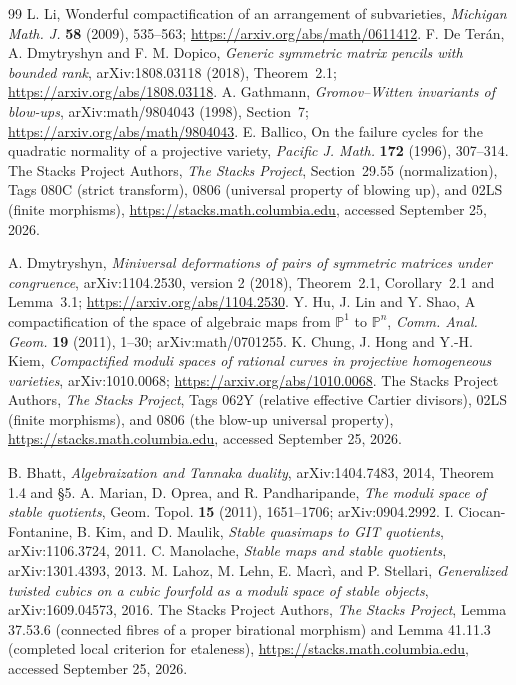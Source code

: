 \documentclass[11pt,reqno]{amsart}
\numberwithin{equation}{section}
\theoremstyle{definition}\newtheorem{definition}[theorem]{Definition}
\theoremstyle{remark}\newtheorem{remark}[theorem]{Remark}
\newcommand{\Pj}{\mathbb P}\newcommand{\A}{\mathbb A}
\begin{document}
\begin{thebibliography}{99}
L. Li, Wonderful compactification of an arrangement of subvarieties,
\emph{Michigan Math. J.} \textbf{58} (2009), 535--563;
\url{https://arxiv.org/abs/math/0611412}.
F. De Ter\'an, A. Dmytryshyn and F. M. Dopico,
\emph{Generic symmetric matrix pencils with bounded rank},
arXiv:1808.03118 (2018), Theorem~2.1;
\url{https://arxiv.org/abs/1808.03118}.
A. Gathmann, \emph{Gromov--Witten invariants of blow-ups},
arXiv:math/9804043 (1998), Section~7;
\url{https://arxiv.org/abs/math/9804043}.
E. Ballico, On the failure cycles for the quadratic normality of a
projective variety, \emph{Pacific J. Math.} \textbf{172} (1996),
307--314.
The Stacks Project Authors, \emph{The Stacks Project},
Section~29.55 (normalization), Tags 080C (strict transform),
0806 (universal property of blowing up), and 02LS (finite morphisms),
\url{https://stacks.math.columbia.edu}, accessed September 25, 2026.

A. Dmytryshyn, \emph{Miniversal deformations of pairs of symmetric
matrices under congruence}, arXiv:1104.2530, version 2 (2018),
Theorem~2.1, Corollary~2.1 and Lemma~3.1;
\url{https://arxiv.org/abs/1104.2530}.
Y. Hu, J. Lin and Y. Shao, A compactification of the space of algebraic
maps from $\Pj^1$ to $\Pj^n$, \emph{Comm. Anal. Geom.}
\textbf{19} (2011), 1--30; arXiv:math/0701255.
K. Chung, J. Hong and Y.-H. Kiem, \emph{Compactified moduli spaces
of rational curves in projective homogeneous varieties},
arXiv:1010.0068; \url{https://arxiv.org/abs/1010.0068}.
The Stacks Project Authors, \emph{The Stacks Project},
Tags 062Y (relative effective Cartier divisors), 02LS (finite morphisms),
and 0806 (the blow-up universal property),
\url{https://stacks.math.columbia.edu}, accessed September 25, 2026.

B. Bhatt, \emph{Algebraization and Tannaka duality},
arXiv:1404.7483, 2014, Theorem 1.4 and \S5.
A. Marian, D. Oprea, and R. Pandharipande,
\emph{The moduli space of stable quotients}, Geom. Topol.
\textbf{15} (2011), 1651--1706; arXiv:0904.2992.
I. Ciocan-Fontanine, B. Kim, and D. Maulik,
\emph{Stable quasimaps to GIT quotients}, arXiv:1106.3724, 2011.
C. Manolache, \emph{Stable maps and stable quotients},
arXiv:1301.4393, 2013.
M. Lahoz, M. Lehn, E. Macr\`i, and P. Stellari,
\emph{Generalized twisted cubics on a cubic fourfold as a moduli
space of stable objects}, arXiv:1609.04573, 2016.
The Stacks Project Authors, \emph{The Stacks Project},
Lemma 37.53.6 (connected fibres of a proper birational morphism)
and Lemma 41.11.3 (completed local criterion for etaleness),
\url{https://stacks.math.columbia.edu}, accessed September 25, 2026.

\end{thebibliography}
\end{document}
